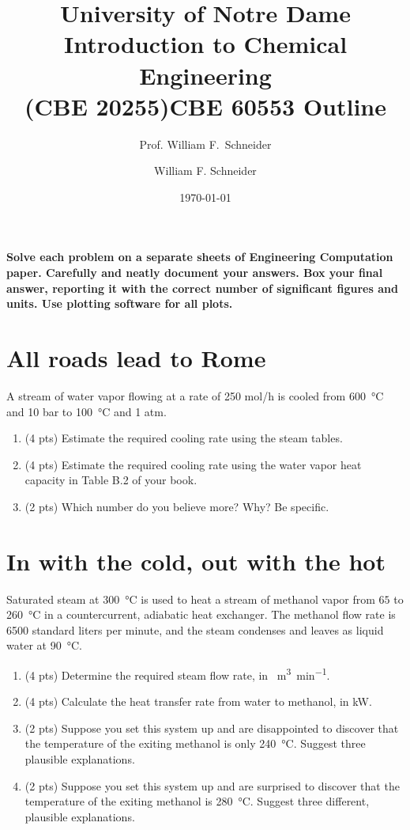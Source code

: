 \documentclass[11pt]{article}
\title{University of Notre Dame\\Introduction to Chemical Engineering\\(CBE 20255)}
\author{Prof. William F.\ Schneider}
\author{William F. Schneider}
\date{\today}
\title{CBE 60553 Outline}
\begin{document}
\begin{options}
\end{options}

\noindent \textbf{Solve each problem on a separate sheets of Engineering Computation paper.  Carefully and neatly document your answers. Box your final answer, reporting it with the correct number of significant figures and units.  Use plotting software for all plots.}


\section{All roads lead to Rome}
\label{sec-1}
A stream of water vapor flowing at a rate of 250 mol/h is cooled from \SI{600}{\celsius} and 10 bar to \SI{100}{\celsius} and 1 atm.
\begin{enumerate}
\item (4 pts) Estimate the required cooling rate using the steam tables.
\item (4 pts) Estimate the required cooling rate using the water vapor heat capacity in Table B.2 of your book.
\item (2 pts) Which number do you believe more?  Why?  Be specific.
\end{enumerate}


\section{In with the cold, out with the hot}
\label{sec-2}
Saturated steam at \SI{300}{\celsius} is used to heat a stream of methanol vapor from $65$ to \SI{260}{\celsius} in a countercurrent, adiabatic heat exchanger.  The methanol flow rate is 6500 standard liters per minute, and the steam condenses and leaves as liquid water at \SI{90}{\celsius}.
\begin{enumerate}
\item (4 pts) Determine the required steam flow rate, in \SI{}{\meter\cubed\per\minute}.
\item (4 pts) Calculate the heat transfer rate from water to methanol, in kW.
\item (2 pts) Suppose you set this system up and are disappointed to discover that the temperature of the exiting methanol is only \SI{240}{\celsius}.  Suggest three plausible explanations.
\item (2 pts) Suppose you set this system up and are surprised to discover that the temperature of the exiting methanol is  \SI{280}{\celsius}.  Suggest three different, plausible explanations.
\end{enumerate}
\end{document}
